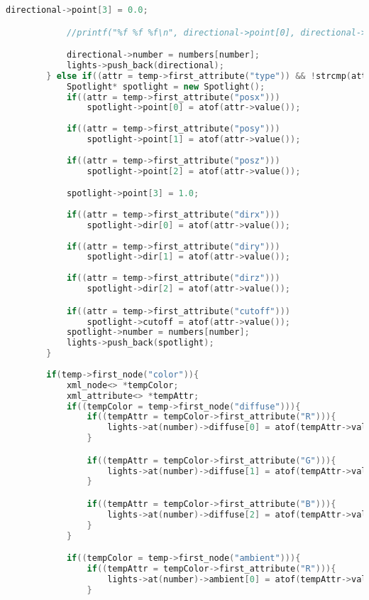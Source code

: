 \documentclass[14pt, a4 paper]{report}
\begin{document}
\begin{lstlisting}[language = c++]
            directional->point[3] = 0.0;

            //printf("%f %f %f\n", directional->point[0], directional->point[1], directional->point[2]);

            directional->number = numbers[number];
            lights->push_back(directional);
        } else if((attr = temp->first_attribute("type")) && !strcmp(attr->value(), "spotlight")){
            Spotlight* spotlight = new Spotlight();
            if((attr = temp->first_attribute("posx")))
                spotlight->point[0] = atof(attr->value());
        
            if((attr = temp->first_attribute("posy")))
                spotlight->point[1] = atof(attr->value());
        
            if((attr = temp->first_attribute("posz")))
                spotlight->point[2] = atof(attr->value());

            spotlight->point[3] = 1.0;
        
            if((attr = temp->first_attribute("dirx")))
                spotlight->dir[0] = atof(attr->value());
        
            if((attr = temp->first_attribute("diry")))
                spotlight->dir[1] = atof(attr->value());
        
            if((attr = temp->first_attribute("dirz")))
                spotlight->dir[2] = atof(attr->value());

            if((attr = temp->first_attribute("cutoff")))
                spotlight->cutoff = atof(attr->value());
            spotlight->number = numbers[number];
            lights->push_back(spotlight);
        }
        
        if(temp->first_node("color")){
            xml_node<> *tempColor;
            xml_attribute<> *tempAttr;
            if((tempColor = temp->first_node("diffuse"))){
                if((tempAttr = tempColor->first_attribute("R"))){
                    lights->at(number)->diffuse[0] = atof(tempAttr->value())/255;
                }

                if((tempAttr = tempColor->first_attribute("G"))){
                    lights->at(number)->diffuse[1] = atof(tempAttr->value())/255;
                }

                if((tempAttr = tempColor->first_attribute("B"))){
                    lights->at(number)->diffuse[2] = atof(tempAttr->value())/255;
                }
            }

            if((tempColor = temp->first_node("ambient"))){
                if((tempAttr = tempColor->first_attribute("R"))){
                    lights->at(number)->ambient[0] = atof(tempAttr->value())/255;
                }


\end{lstlisting}
\end{document}
